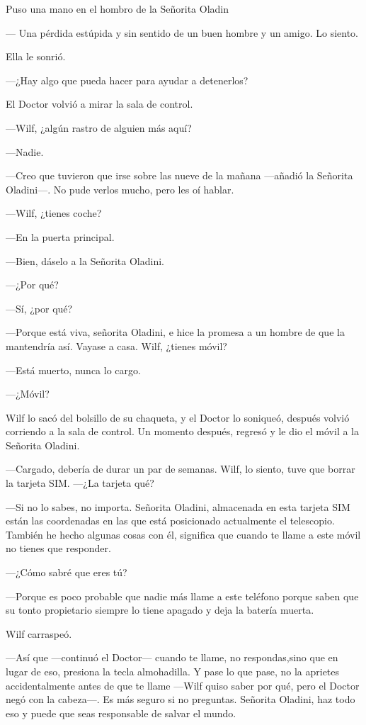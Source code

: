 Puso una mano en el hombro de la Señorita Oladin

--- Una pérdida estúpida y sin sentido de un buen hombre y un amigo. Lo
siento.

Ella le sonrió.

---¿Hay algo que pueda hacer para ayudar a detenerlos?

El Doctor volvió a mirar la sala de control.

---Wilf, ¿algún rastro de alguien más aquí?

---Nadie.

---Creo que tuvieron que irse sobre las nueve de la mañana ---añadió la
Señorita Oladini---. No pude verlos mucho, pero les oí hablar.

---Wilf, ¿tienes coche?

---En la puerta principal.

---Bien, dáselo a la Señorita Oladini.

---¿Por qué?

---Sí, ¿por qué?

---Porque está viva, señorita Oladini, e hice la promesa a un hombre de
que la mantendría así. Vayase a casa. Wilf, ¿tienes móvil?

---Está muerto, nunca lo cargo.

---¿Móvil?

Wilf lo sacó del bolsillo de su chaqueta, y el Doctor lo soniqueó,
después volvió corriendo a la sala de control. Un momento después,
regresó y le dio el móvil a la Señorita Oladini.

---Cargado, debería de durar un par de semanas. Wilf, lo siento, tuve
que borrar la tarjeta SIM. ---¿La tarjeta qué?

---Si no lo sabes, no importa. Señorita Oladini, almacenada en esta
tarjeta SIM están las coordenadas en las que está posicionado
actualmente el telescopio. También he hecho algunas cosas con él,
significa que cuando te llame a este móvil no tienes que responder.

---¿Cómo sabré que eres tú?

---Porque es poco probable que nadie más llame a este teléfono porque
saben que su tonto propietario siempre lo tiene apagado y deja la
batería muerta.

Wilf carraspeó.

---Así que ---continuó el Doctor--- cuando te llame, no respondas,sino
que en lugar de eso, presiona la tecla almohadilla. Y pase lo que pase,
no la aprietes accidentalmente antes de que te llame ---Wilf quiso saber
por qué, pero el Doctor negó con la cabeza---. Es más seguro si no
preguntas. Señorita Oladini, haz todo eso y puede que seas responsable
de salvar el mundo.

